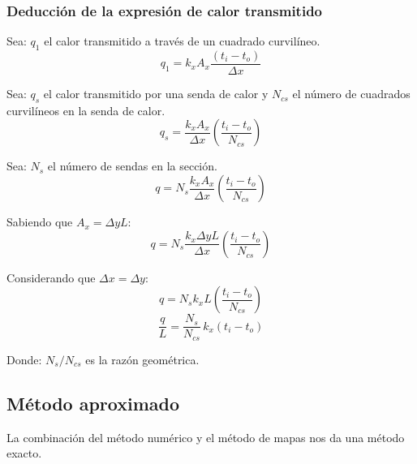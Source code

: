 \subsubsection{Deducción de la expresión de calor transmitido}
Sea: $q_1$ el calor transmitido a través de un cuadrado curvilíneo.
\begin{equation*}
    q_1=k_x A_x\frac{(t_i-t_o)}{\Delta x}
\end{equation*}

Sea: $q_s$ el calor transmitido por una senda de calor y $N_{cs}$ el número de
cuadrados curvilíneos en la senda de calor.
\begin{equation*}
    q_s=\frac{k_x A_x}{\Delta x}\left(\frac{t_i-t_o}{N_{cs}}\right)
\end{equation*}

Sea: $N_{s}$  el número de sendas en la sección.
\begin{equation*}
    q=N_s\frac{k_x A_x}{\Delta x}\left(\frac{t_i-t_o}{N_{cs}}\right)
\end{equation*}

Sabiendo que $A_x=\Delta y L$:
\begin{equation*}
    q=N_s\frac{k_x \Delta y L}{\Delta x}\left(\frac{t_i-t_o}{N_{cs}}\right)
\end{equation*}

Considerando que $\Delta x=\Delta y$:
\begin{equation*}
    q=N_s k_x L\left(\frac{t_i-t_o}{N_{cs}}\right)
\end{equation*}
\begin{equation}
    \frac{q}{L}=\frac{N_s}{N_{cs}}\,k_x(t_i-t_o)
\end{equation}

Donde: $N_s/N_{cs}$ es la razón geométrica.

\subsection{Método aproximado}
La combinación del método numérico y el método de mapas nos da una método
exacto.

